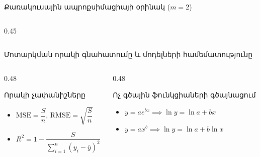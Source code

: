 \documentclass[aspectratio=169,11pt]{beamer}
\begin{document}
\begin{frame}{Քառակուսային ապրոքսիմացիայի օրինակ ($m = 2$)}
\begin{columns}[T]
\begin{column}{0.45\textwidth}
        \end{column}
    \end{columns}
\end{frame}

\begin{frame}{Մոտարկման որակի գնահատումը և մոդելների համեմատությունը}
    \begin{columns}[T]
        \begin{column}{0.48\textwidth}
            \begin{block}{Որակի չափանիշները}
                \begin{itemize}
                    \item $\mathrm{MSE} = \dfrac{S}{n}$, \quad $\mathrm{RMSE} = \sqrt{\dfrac{S}{n}}$
                    \item $R^2 = 1 - \dfrac{S}{\sum_{i=1}^n (y_i - \bar{y})^2}$
                \end{itemize}
            \end{block}
        \end{column}

        \begin{column}{0.48\textwidth}
            \begin{block}{Ոչ գծային ֆունկցիաների գծայնացում}
                \begin{itemize}
                    \item $y = ae^{bx} \implies \ln y = \ln a + bx$
                    \item $y = ax^b \implies \ln y = \ln a + b\ln x$
                \end{itemize}
            \end{block}
        \end{column}
    \end{columns}


\end{frame}
\end{document}
